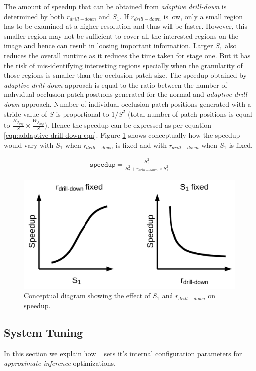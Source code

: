 The amount of speedup that can be obtained from \textit{adaptive drill-down} is determined by both $r_{drill-down}$ and $S_1$.
If $r_{drill-down}$ is low, only a small region has to be examined at a higher resolution and thus will be faster.
However, this smaller region may not be sufficient to cover all the interested regions on the image and hence can result in loosing important information.
Larger $S_1$ also reduces the overall runtime as it reduces the time taken for stage one. But it has the risk of mis-identifying interesting regions specially when the granularity of those regions is smaller than the occlusion patch size.
The speedup obtained by \textit{adaptive drill-down} approach is equal to the ratio between the number of individual occlusion patch positions generated for the normal and \textit{adaptive drill-down} approach.
Number of individual occlusion patch positions generated with a stride value of $S$ is proportional to $1/S^2$ (total number of patch positions is equal to $\frac{H_{\mathcal{I}_{img}}}{S} \times \frac{W_{\mathcal{I}_{img}}}{S}$).
Hence the speedup can  be expressed as per equation \ref{eqn:addaptive-drill-down-eqn}.
Figure \ref{fig:r_and_s1} shows conceptually how the speedup would vary with $S_1$ when $r_{drill-down}$ is fixed and with $r_{drill-down}$ when $S_1$ is fixed.

\begin{align}
\label{eqn:addaptive-drill-down-eqn}
\texttt{speedup} = \frac{S^2_1}{S^2_2+r_{drill-down} \times S^2_1}
\end{align}

\begin{figure}[t]
\includegraphics[width=0.7\columnwidth]{images/r_and_s1}
\caption{Conceptual diagram showing the effect of $S_1$ and $r_{drill-down}$ on speedup.}
\label{fig:r_and_s1}
\end{figure}

\subsection{System Tuning}
In this section we explain how \system~ sets it's internal configuration parameters for \textit{approximate inference} optimizations.

